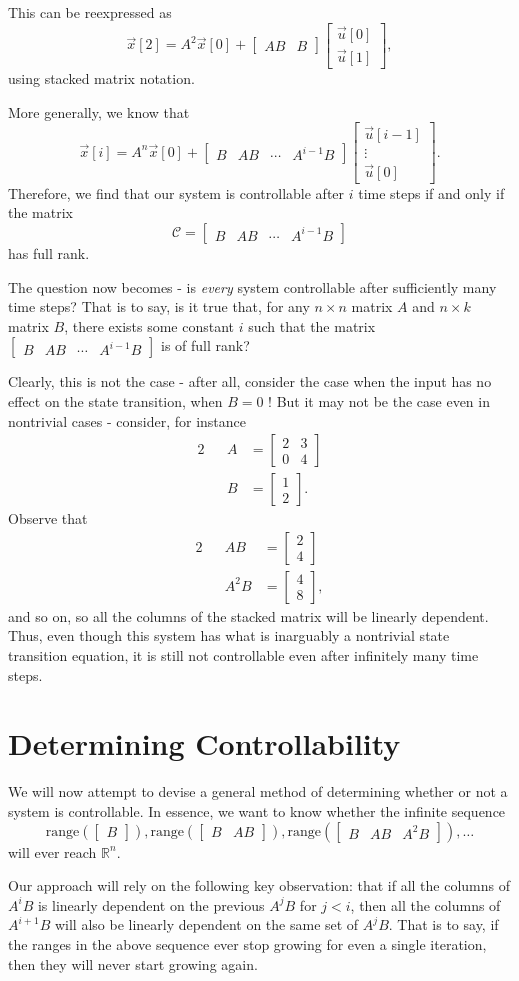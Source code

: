 \documentclass[letterpaper]{article}
\theoremstyle{remark}
\newcommand{\mat}[1]{\ensuremath{\begin{bmatrix}#1\end{bmatrix}}}
\newcommand{\eqn}[1]{\begin{alignat*}{2}#1\end{alignat*}}
\begin{document}
This can be reexpressed as
\[
    \vec{x}[2] = A^2\vec{x}[0] + \mat{AB & B} \mat{\vec{u}[0] \\ \vec{u}[1]},
\]
using stacked matrix notation.

More generally, we know that
\[
    \vec{x}[i] = A^n\vec{x}[0] + \mat{B & AB & \cdots & A^{i - 1}B} \mat{\vec{u}[i - 1] \\ \vdots \\ \vec{u}[0]}.
\]
Therefore, we find that our system is controllable after $i$ time steps if and only if the matrix
\[
    \mathscr{C} = \mat{B & AB & \cdots & A^{i - 1}B}
\]
has full rank.

The question now becomes - is \emph{every} system controllable after sufficiently many time steps? That is to say, is it true that, for any $n\times n$ matrix $A$ and $n\times k$ matrix $B$, there exists some constant $i$ such that the matrix $\mat{B & AB & \cdots & A^{i - 1}B}$ is of full rank?

Clearly, this is not the case - after all, consider the case when the input has no effect on the state transition, when $B = 0$ ! But it may not be the case even in nontrivial cases - consider, for instance
\eqn{
    && A &= \mat{2 & 3 \\ 0 & 4} \\
    && B &= \mat{1 \\ 2}.
}
Observe that
\eqn{
    && AB &= \mat{2 \\ 4} \\
    && A^2B &= \mat{4 \\ 8},
}
and so on, so all the columns of the stacked matrix will be linearly dependent. Thus, even though this system has what is inarguably a nontrivial state transition equation, it is still not controllable even after infinitely many time steps.

\section{Determining Controllability}
We will now attempt to devise a general method of determining whether or not a system is controllable. In essence, we want to know whether the infinite sequence
\[
    \text{range}(\mat{B}), \text{range}(\mat{ B & AB}), \text{range}(\mat{B & AB & A^2B}), \ldots
\]
will ever reach $\mathbb{R}^n$.

Our approach will rely on the following key observation: that if all the columns of $A^iB$ is linearly dependent on the previous $A^jB$ for $j < i$, then all the columns of $A^{i+1}B$ will also be linearly dependent on the same set of $A^jB$. That is to say, if the ranges in the above sequence ever stop growing for even a single iteration, then they will never start growing again.
\end{document}

